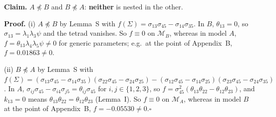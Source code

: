 \documentclass[10pt,a4paper]{article}
\newcommand{\nnest}{\not\preceq}
\begin{document}
\noindent\textbf{Claim.} $A \nnest B$ and $B \nnest A$: \textbf{neither} is nested in the other.\par\smallskip
\noindent\textbf{Proof.} (i) $A\nnest B$ by Lemma~S with $f(\Sigma)=\sigma_{13}\sigma_{45} - \sigma_{14}\sigma_{35}$. In $B$, $\theta_{13}=0$, so $\sigma_{13}=\lambda_1\lambda_3\psi$ and the tetrad vanishes. So $f\equiv0$ on $\mathcal M_B$, whereas in model $A$, $f=\theta_{13}\lambda_4\lambda_5\psi\neq0$ for generic parameters; e.g.\ at the point of Appendix~B, $f=0.01863\neq0$.\par\smallskip
\noindent(ii) $B\nnest A$ by Lemma~S with $f(\Sigma)=(\sigma_{13}\sigma_{45} - \sigma_{14}\sigma_{35})(\sigma_{22}\sigma_{45} - \sigma_{24}\sigma_{25}) - (\sigma_{12}\sigma_{45} - \sigma_{14}\sigma_{25})(\sigma_{23}\sigma_{45} - \sigma_{24}\sigma_{35})$. In $A$, $\sigma_{ij}\sigma_{45}-\sigma_{i4}\sigma_{j5}=\theta_{ij}\sigma_{45}$ for $i,j\in\{1,2,3\}$, so $f=\sigma_{45}^2(\theta_{13}\theta_{22}-\theta_{12}\theta_{23})$, and $k_{13}=0$ means $\theta_{13}\theta_{22}=\theta_{12}\theta_{23}$ (Lemma~I). So $f\equiv0$ on $\mathcal M_A$, whereas in model $B$ at the point of Appendix~B, $f=-0.05530\neq0$.\hfill$\square$\par\medskip
{}

\clearpage
\end{document}
